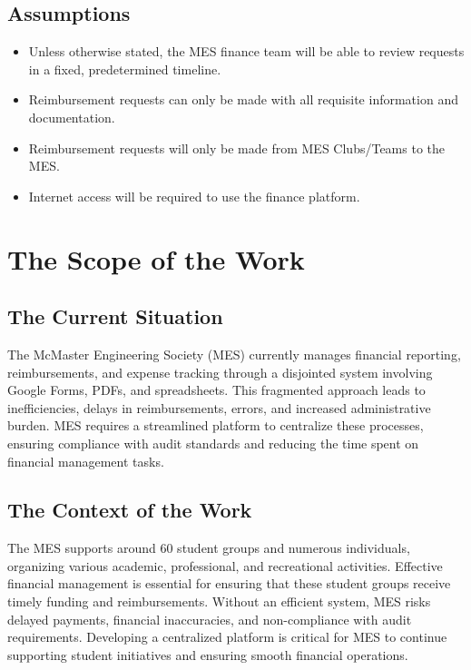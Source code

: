 \documentclass[12pt]{article}
\begin{document}
\subsection{Assumptions}
\begin{itemize}
    \item Unless otherwise stated, the MES finance team will be able to review requests in a fixed, predetermined timeline.
    \item Reimbursement requests can only be made with all requisite information and documentation.
    \item Reimbursement requests will only be made from MES Clubs/Teams to the MES.
    \item Internet access will be required to use the finance platform.
\end{itemize}


\section{The Scope of the Work}

\subsection{The Current Situation}
The McMaster Engineering Society (MES) currently manages financial reporting, reimbursements, and expense tracking through a disjointed system involving Google Forms, PDFs, and spreadsheets. This fragmented approach leads to inefficiencies, delays in reimbursements, errors, and increased administrative burden. MES requires a streamlined platform to centralize these processes, ensuring compliance with audit standards and reducing the time spent on financial management tasks.

\subsection{The Context of the Work}
The MES supports around 60 student groups and numerous individuals, organizing various academic, professional, and recreational activities. Effective financial management is essential for ensuring that these student groups receive timely funding and reimbursements. Without an efficient system, MES risks delayed payments, financial inaccuracies, and non-compliance with audit requirements. Developing a centralized platform is critical for MES to continue supporting student initiatives and ensuring smooth financial operations.
\end{document}
